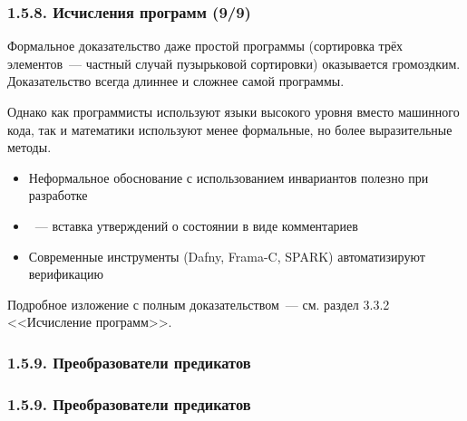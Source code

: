 \begin{frame}
\frametitle{1.5.8. Исчисления программ (9/9)}

\begin{digress}
Формальное доказательство даже простой программы (сортировка трёх элементов~--- 
частный случай пузырьковой сортировки) оказывается громоздким.
Доказательство всегда длиннее и сложнее самой программы.

Однако как программисты используют языки высокого уровня вместо машинного кода,
так и математики используют менее формальные, но более выразительные методы.
\end{digress}

\begin{itemize}
\item Неформальное обоснование с использованием инвариантов полезно при разработке
\item {}~--- 
вставка утверждений о состоянии в виде комментариев
\item Современные инструменты (Dafny, Frama-C, SPARK) автоматизируют верификацию
\end{itemize}

\begin{remark}
Подробное изложение с полным доказательством~--- 
см. раздел 3.3.2 <<Исчисление программ>>.
\end{remark}

\bigskip
{}

\end{frame}



\subsubsection{1.5.9. Преобразователи предикатов}\label{1.5.9.}
\begin{frame}
\frametitle{1.5.9. Преобразователи предикатов}

\end{frame}

